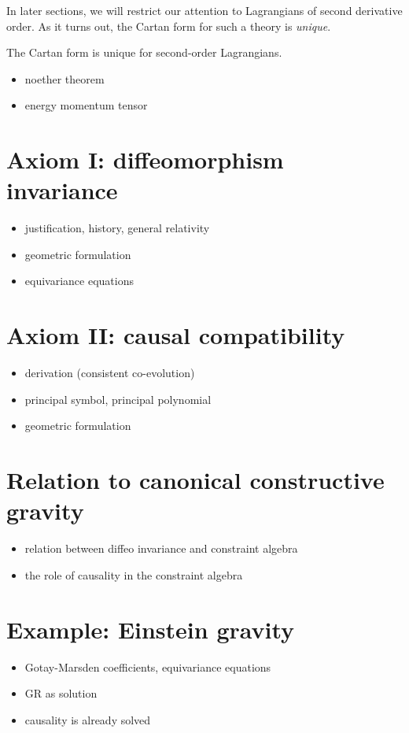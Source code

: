 In later sections, we will restrict our attention to Lagrangians of second derivative order. As it turns out, the Cartan form for such a theory is \emph{unique}.
\begin{proposition}
  The Cartan form is unique for second-order Lagrangians.
\end{proposition}

\begin{itemize}
\item noether theorem
\item energy momentum tensor
\end{itemize}

\section{Axiom I: diffeomorphism invariance}
\begin{itemize}
\item justification, history, general relativity
\item geometric formulation
\item equivariance equations
\end{itemize}

\section{Axiom II: causal compatibility}
\begin{itemize}
\item derivation (consistent co-evolution)
\item principal symbol, principal polynomial
\item geometric formulation
\end{itemize}

\section{Relation to canonical constructive gravity}
\begin{itemize}
\item relation between diffeo invariance and constraint algebra
\item the role of causality in the constraint algebra
\end{itemize}

\section{Example: Einstein gravity}
\begin{itemize}
\item Gotay-Marsden coefficients, equivariance equations
\item GR as solution
\item causality is already solved
\end{itemize}

